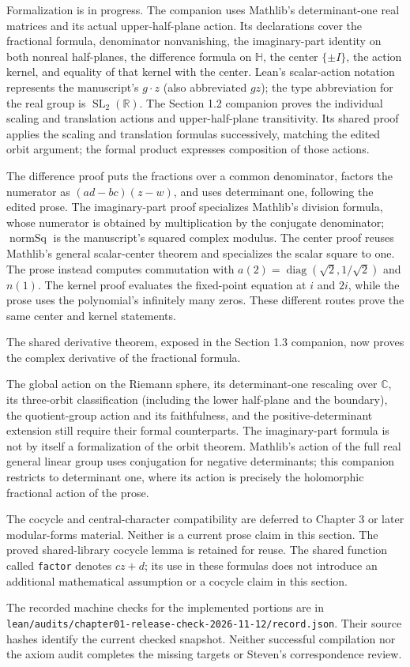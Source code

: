 Formalization is in progress. The companion uses Mathlib's determinant-one real matrices and its actual upper-half-plane action. Its declarations cover the fractional formula, denominator nonvanishing, the imaginary-part identity on both nonreal half-planes, the difference formula on $\mathbb H$, the center $\{\pm I\}$, the action kernel, and equality of that kernel with the center. Lean's scalar-action notation represents the manuscript's $g\cdot z$ (also abbreviated $gz$); the type abbreviation for the real group is $\operatorname{SL}_2(\mathbb R)$. The Section 1.2 companion proves the individual scaling and translation actions and upper-half-plane transitivity. Its shared proof applies the scaling and translation formulas successively, matching the edited orbit argument; the formal product expresses composition of those actions.

The difference proof puts the fractions over a common denominator, factors the numerator as $(ad-bc)(z-w)$, and uses determinant one, following the edited prose. The imaginary-part proof specializes Mathlib's division formula, whose numerator is obtained by multiplication by the conjugate denominator; $\operatorname{normSq}$ is the manuscript's squared complex modulus. The center proof reuses Mathlib's general scalar-center theorem and specializes the scalar square to one. The prose instead computes commutation with $a(2)=\operatorname{diag}(\sqrt2,1/\sqrt2)$ and $n(1)$. The kernel proof evaluates the fixed-point equation at $i$ and $2i$, while the prose uses the polynomial's infinitely many zeros. These different routes prove the same center and kernel statements.

The shared derivative theorem, exposed in the Section 1.3 companion, now proves the complex derivative of the fractional formula.

The global action on the Riemann sphere, its determinant-one rescaling over $\mathbb C$, its three-orbit classification (including the lower half-plane and the boundary), the quotient-group action and its faithfulness, and the positive-determinant extension still require their formal counterparts. The imaginary-part formula is not by itself a formalization of the orbit theorem. Mathlib's action of the full real general linear group uses conjugation for negative determinants; this companion restricts to determinant one, where its action is precisely the holomorphic fractional action of the prose.

The cocycle and central-character compatibility are deferred to Chapter 3 or later modular-forms material. Neither is a current prose claim in this section. The proved shared-library cocycle lemma is retained for reuse. The shared function called \texttt{factor} denotes $cz+d$; its use in these formulas does not introduce an additional mathematical assumption or a cocycle claim in this section.

The recorded machine checks for the implemented portions are in \texttt{lean/audits/chapter01-release-check-2026-11-12/record.json}. Their source hashes identify the current checked snapshot. Neither successful compilation nor the axiom audit completes the missing targets or Steven's correspondence review.
